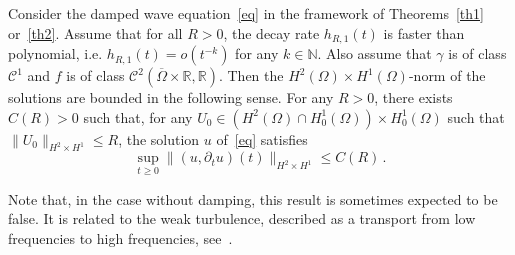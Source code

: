 \documentclass[AHL,Unicode,longabstracts]{cedram}
\newcommand{\RR}{\mathbb{R}}
\newcommand{\NN}{\mathbb{N}}
\newcommand{\Cc}{\mathcal{C}}
\begin{document}
\begin{theo}\label{th-norm-H2}
Consider the damped wave equation~\eqref{eq} in the framework of Theorems~\ref{th1} or~\ref{th2}. Assume that for all $R>0$, the decay rate $h_{R,1}(t)$ is faster than polynomial, i.e. $h_{R,1}(t)=o(t^{-k})$ for any $k\in\NN$. Also assume that $\gamma$ is of class $\Cc^1$ and $f$ is of class $\Cc^2(\overline\Omega\times \RR,\RR)$. Then the $H^2(\Omega)\times H^1(\Omega)$-norm of the solutions are bounded in the following sense. For any $R>0$, there exists $C(R)>0$ such that, for any $U_0\in (H^{2}(\Omega)\cap H^1_0(\Omega))\times H^1_0(\Omega)$ such that $\|U_0\|_{H^2\times H^1} \leq R$, the solution $u$ of~\eqref{eq} satisfies
\[
\sup_{t\geq 0} \|(u,\partial_t u)(t)\|_{H^2\times H^1} \leq C(R)\,.
\]
\end{theo}

Note that, in the case without damping, this result is sometimes expected to be false. It is related to the weak turbulence, described as a transport from low frequencies to high frequencies, see~\cite{Colliander,Gerard-Grellier,Hani}.


\end{document}
